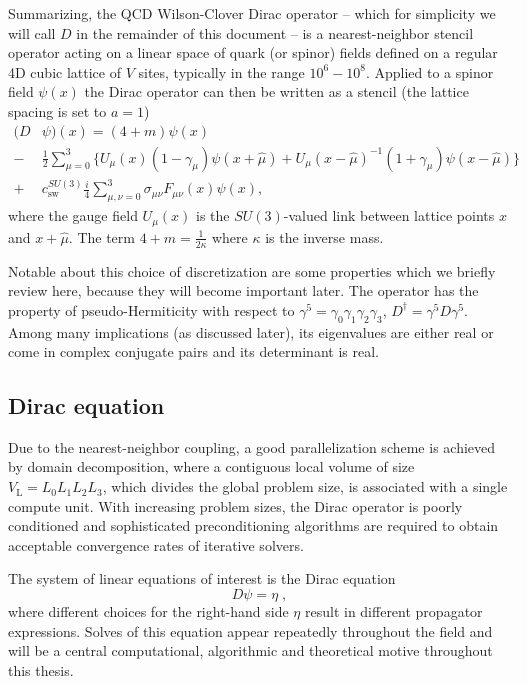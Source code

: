 Summarizing, the QCD Wilson-Clover Dirac operator -- which for simplicity we will call $D$ in the remainder of this document -- is a nearest-neighbor stencil operator acting on a linear space of quark (or spinor) fields defined on a regular 4D cubic lattice of $V$ sites, typically in the range $10^6-10^8$.
Applied to a spinor field $\psi(x)$ the Dirac operator can then be written as a stencil (the lattice spacing is set to $a = 1$)
\begin{equation}
\begin{aligned} \label{eq:Dw}
(D &\psi)(x) = (4 + m) \psi(x) \\
-&\frac{1}{2} \sum_{\mu=0}^3 \Big\{
  U_{\mu}(x) (1-\gamma_{\mu}) \psi(x + \hat{\mu})
+ U_{\mu}(x-\hat{\mu})^{-1} (1+\gamma_{\mu}) \psi(x-\hat{\mu})
\Big\} \\
+&c_\mathrm{sw}^{SU(3)} \frac{i}{4} \sum_{\mu,\nu=0}^3 \sigma_{\mu \nu} F_{\mu \nu}(x) \psi(x),
\end{aligned}
\end{equation}
where the gauge field $U_{\mu}(x)$ is the $SU(3)$-valued link between lattice points $x$ and $x + \hat{\mu}$.
The term $4+m = \frac{1}{2 \kappa}$ where $\kappa$ is the inverse mass.

Notable about this choice of discretization are some properties which we briefly review here, because they will become important later.
The operator has the property of pseudo-Hermiticity with respect to $\gamma^5 = \gamma_0 \gamma_1 \gamma_2 \gamma_3$, $D^{\dagger} = \gamma^{5} D \gamma^{5}$.
Among many implications (as discussed later), its eigenvalues are either real or come in complex conjugate pairs and its determinant is real.

\subsection{Dirac equation}

Due to the nearest-neighbor coupling, a good parallelization scheme is achieved by domain decomposition, where a contiguous local volume of size $V_\mathrm{L}=L_0 L_1 L_2 L_3$, which divides the global problem size, is associated with a single compute unit.
With increasing problem sizes, the Dirac operator is poorly conditioned and sophisticated preconditioning algorithms are required to obtain acceptable convergence rates of iterative solvers.

The system of linear equations of interest is the Dirac equation
\begin{equation} \label{eq:dirac:equation}
  D \psi = \eta \;,
\end{equation}
where different choices for the right-hand side $\eta$ result in different propagator expressions.
Solves of this equation appear repeatedly throughout the field and will be a central computational, algorithmic and theoretical motive throughout this thesis.


